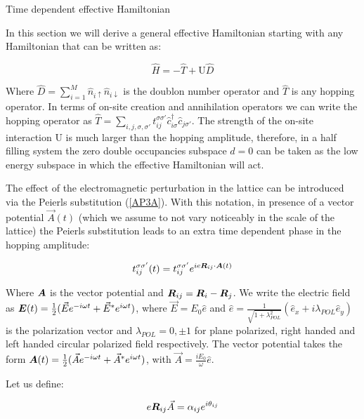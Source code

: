 \begin{section}{Time dependent effective Hamiltonian}
\label{SectionTDHeff}

In this section we will derive a general effective Hamiltonian starting with any Hamiltonian that can be written as:

\begin{equation}
\hat{H} = -\hat{T} + \text{U}\hat{D}
\end{equation}

Where $\hat{D} = \sum_{i=1}^M \hat{n}_{i\uparrow}\hat{n}_{i\downarrow}$ is the doublon number operator and $\hat{T}$ is any hopping operator. In terms of on-site creation and annihilation operators we can write the hopping operator as $\hat{T} = \sum_{i,j, \sigma, \sigma'} t_{ij}^{\sigma \sigma'} \hat{c}_{i \sigma}^\dagger \hat{c}_{j \sigma'}$. The strength of the on-site interaction $\text{U}$ is much larger than the hopping amplitude, therefore, in a half filling system the zero double occupancies subspace $d=0$ can be taken as the low energy subspace in which the effective Hamiltonian will act.

The effect of the electromagnetic perturbation in the lattice can be introduced via the Peierls substitution (\ref{AP3A}). With this notation, in presence of a vector potential $\vec{A}(t)$ (which we assume to not vary noticeably in the scale of the lattice) the Peierls substitution leads to an extra time dependent phase in the hopping amplitude:

\begin{equation}
t_{ij}^{\sigma \sigma'}(t) = t_{ij}^{\sigma \sigma'} e^{ie\boldsymbol{R}_{ij}\cdot\boldsymbol{A}(t)}
\end{equation}

Where $\boldsymbol{A}$ is the vector potential and $\boldsymbol{R}_{ij} = \boldsymbol{R}_i-\boldsymbol{R}_j$. We write the electric field as $\boldsymbol{E}(t) = \frac{1}{2}(\vec{E}e^{-i\omega t}+\vec{E}^*e^{i\omega t})$, where $\vec{E} = E_0\hat{e}$ and $\hat{e} = \frac{1}{\sqrt{1+\lambda_{POL}^2}}(\hat{e}_x+i\lambda_{POL}\hat{e}_y)$ is the polarization vector and $\lambda_{POL} = 0, \pm 1$ for plane polarized, right handed and left handed circular polarized field respectively. The vector potential takes the form $\boldsymbol{A}(t) = \frac{1}{2}(\vec{A}e^{-i\omega t} + \vec{A}^* e^{i\omega t})$, with $\vec{A} = \frac{iE_0}{\omega}\hat{e}$.

Let us define:

\begin{equation}
\label{Def_alpha}
e\boldsymbol{R}_{ij}\vec{A} = \alpha_{ij} e^{i \theta_{ij}}
\end{equation}


\end{section}
